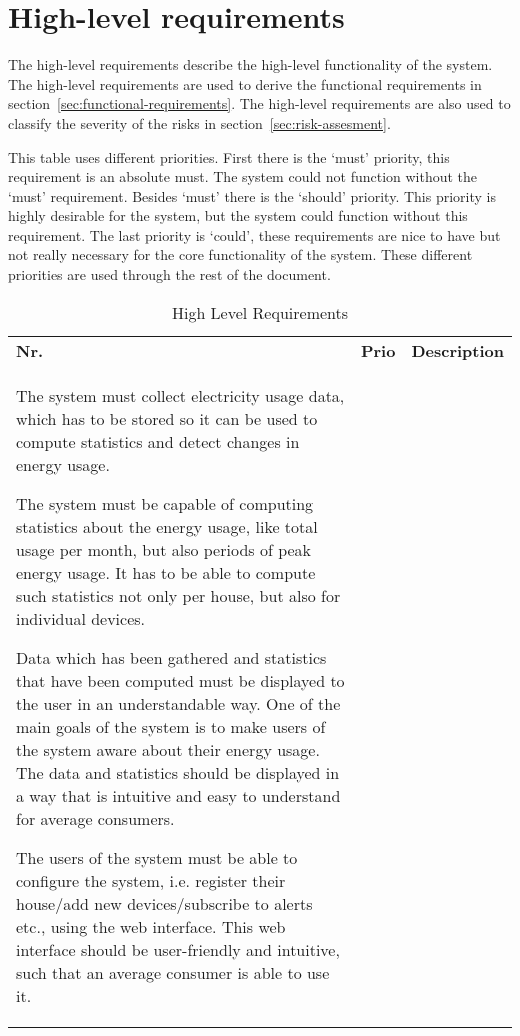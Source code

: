 
\clearpage
\section{High-level requirements}
The high-level requirements describe the high-level functionality of the system. The high-level requirements are used to derive the functional requirements in section~\ref{sec:functional-requirements}. The high-level requirements are also used to classify the severity of the risks in section~\ref{sec:risk-assesment}. 

This table uses different priorities. First there is the `must' priority, this requirement is an absolute must. The system could not function without the `must' requirement. Besides `must' there is the `should' priority. This priority is highly desirable for the system, but the system could function without this requirement. The last priority is `could', these requirements are nice to have but not really necessary for the core functionality of the system. These different priorities are used through the rest of the document.

\begin{longtable}{L{0.1\textwidth} L{0.12\textwidth} L{0.78\textwidth}}
	\textbf{Nr.} & \textbf{Prio} & \textbf{Description} \\
		
	{The system must collect electricity usage data, which has to be stored so it can be used to compute statistics and detect changes in energy usage.}
	
	{ The system must be capable of computing statistics about the energy usage, like total usage per month, but also periods of peak energy usage. It has to be able to compute such statistics not only per house, but also for individual devices. }
	
	{ Data which has been gathered and statistics that have been computed must be displayed to the user in an understandable way. One of the main goals of the system is to make users of the system aware about their energy usage. The data and statistics should be displayed in a way that is intuitive and easy to understand for average consumers. }
	
	{ The users of the system must be able to configure the system, i.e. register their house/add new devices/subscribe to alerts etc., using the web interface. This web interface should be user-friendly and intuitive, such that an average consumer is able to use it. }
			    
	\bottomrule

\caption{High Level Requirements}
\label{table:high-level-requirements}	    
\end{longtable}
